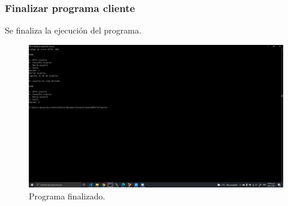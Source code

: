 \documentclass[11pt]{article}
\begin{document}
		\subsubsection{Finalizar programa cliente}		
Se finaliza la ejecución del programa.
	\begin{figure}[H]
			\centering
			\includegraphics[scale=0.34]{resources/finish.png}
			\caption{Programa finalizado.}\label{fig:picture}
		\end{figure}
\end{document}
